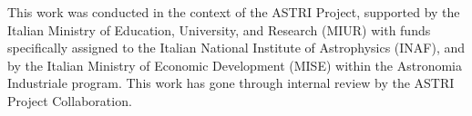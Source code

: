 \date{Received: date / Accepted: date}

\maketitle

\begin{abstract}
.....


\keywords{}
\end{abstract}







\begin{acknowledgements}
This work was conducted in the context of the ASTRI Project, supported by the Italian Ministry of Education, University, and Research (MIUR) with funds specifically assigned to the Italian National Institute of Astrophysics (INAF), and by the Italian Ministry of Economic Development (MISE) within the Astronomia Industriale program. This work has gone through internal review by the ASTRI Project Collaboration.
\end{acknowledgements}

%






